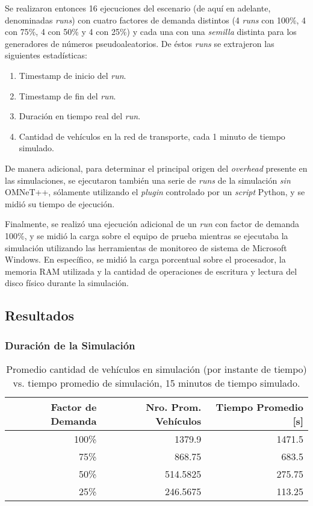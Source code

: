Se realizaron entonces 16 ejecuciones del escenario (de aquí en adelante, denominadas \emph{runs}) con cuatro factores de demanda distintos (4 \emph{runs} con 100\%, 4 con 75\%, 4 con 50\% y 4 con 25\%) y cada una con una \emph{semilla} distinta para los generadores de números pseudoaleatorios. De éstos \emph{runs} se extrajeron las siguientes estadísticas:

\begin{enumerate}
    \item Timestamp de inicio del \emph{run}.
    \item Timestamp de fin del \emph{run}.
    \item Duración en tiempo real del \emph{run}.
    \item Cantidad de vehículos en la red de transporte, cada 1 minuto de tiempo simulado.
\end{enumerate}

De manera adicional, para determinar el principal origen del \emph{overhead} presente en las simulaciones, se ejecutaron también una serie de \emph{runs} de la simulación \emph{sin} OMNeT++, sólamente utilizando el \emph{plugin} controlado por un \emph{script} Python, y se midió su tiempo de ejecución.

Finalmente, se realizó una ejecución adicional de un \emph{run} con factor de demanda 100\%, y se midió la carga sobre el equipo de prueba mientras se ejecutaba la simulación utilizando las herramientas de monitoreo de sistema de Microsoft Windows. En específico, se midió la carga porcentual sobre el procesador, la memoria RAM utilizada y la cantidad de operaciones de escritura y lectura del disco físico durante la simulación.

\subsection{Resultados}

\subsubsection{Duración de la Simulación}

\begin{table}[tpb]
    \centering
    \begin{tabular}{@{}rrr@{}}
        \textbf{Factor de Demanda} & \textbf{Nro. Prom. Vehículos} & \textbf{Tiempo Promedio [s]} \\ \midrule
        100\%           & 1379.9          & 1471.5              \\ %
        75\%            & 868.75          & 683.5               \\ %
        50\%            & 514.5825        & 275.75              \\ %
        25\%            & 246.5675        & 113.25              \\ \bottomrule
    \end{tabular}
    \caption[Cantidad de vehículos vs. tiempo real de simulación]{Promedio cantidad de vehículos en simulación (por instante de tiempo) vs. tiempo promedio de simulación, 15 minutos de tiempo simulado.}
    \label{table:vehiclesvstime}
\end{table}

